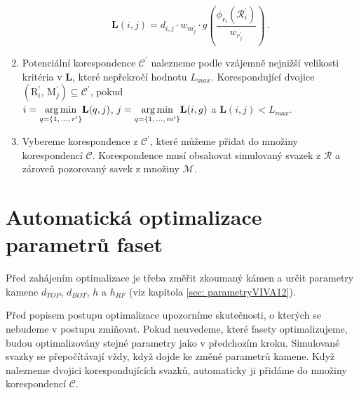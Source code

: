 \begin{enumerate}
\begin{equation}
\mathbf{L}(i,j) = d_{i,j}\cdot w_{m^\prime_{j}} \cdot g \left(\dfrac{\phi_{r_i}(\mathcal{R}^\prime_i)}{w_{r^\prime_{j}}} \right)\,. 
\label{eq: L_tok}
\end{equation}


\item Potenciální korespondence $\mathcal{C}^\prime$ nalezneme podle vzájemně nejnižší velikosti  kritéria v $\mathbf{L}$, které nepřekročí hodnotu $L_{max}$. Korespondující dvojice $\left(\mathrm{R}^\prime_i,\,\mathrm{M}^\prime_j \right) \subseteq \mathcal{C}^\prime$, pokud\\ $i = \underset{{q = \lbrace1,\,\dots,\,r^\prime\rbrace}}{\operatorname*{arg\,min}}\mathbf{L}(q,j)$, $j = \underset{{q = \lbrace1,\,\dots,\,m^\prime\rbrace}}{\operatorname*{arg\,min}}\mathbf{L}(i,g)$ a  $\mathbf{L}(i,j) < L_{max}$. 

\item Vybereme korespondence z $\mathcal{C}^\prime$, které můžeme přidat do množiny korespondencí $\mathcal{C}$. Korespondence musí obsahovat simulovaný svazek z $\mathcal{R}$ a zároveň pozorovaný savek z množiny $\mathcal{M}$. 
\end{enumerate}

\section{Automatická optimalizace parametrů faset}
\label{sec: auto}

Před zahájením optimalizace je třeba změřit zkoumaný kámen a určit parametry kamene $d_{TOP}$, $d_{BOT}$, $h$ a $h_{RF}$ (viz kapitola \ref{sec: parametryVIVA12}). 

Před popisem postupu optimalizace upozorníme skutečnosti, o kterých se nebudeme v postupu zmiňovat. Pokud neuvedeme, které fasety optimalizujeme, budou optimalizovány stejné parametry jako v předchozím kroku. Simulované svazky se přepočítávají vždy, když dojde ke změně parametrů kamene. Když nalezneme dvojici korespondujících svazků, automaticky ji přidáme do množiny korespondencí $\mathcal{C}$.  

